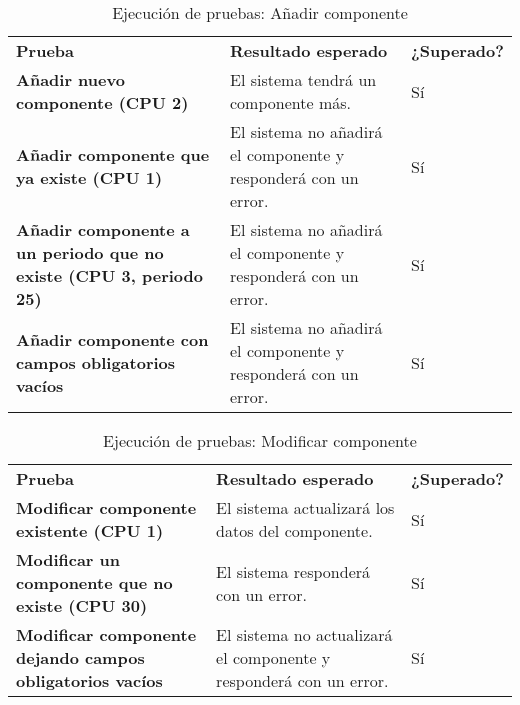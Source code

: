 \begin{table}[H]
\vspace{-4mm}
  \centering
  \caption{Ejecución de pruebas: Añadir componente}
    \begin{tabular}{p{13em}p{18em}p{5em}}
    \toprule
    \rowcolor[rgb]{ .851,  .886,  .953} \multicolumn{3}{p{36em}}{\textbf{Añadir componente}} \\ \midrule
    \rowcolor[rgb]{ .949,  .949,  .949} \textbf{Prueba} & \textbf{Resultado esperado} & \textbf{¿Superado?} \\ \midrule
    \textbf{Añadir nuevo componente (CPU 2)} & El sistema tendrá un componente más.  & Sí  \\ \midrule
    \textbf{Añadir componente que ya existe (CPU 1)} & El sistema no añadirá el componente y responderá con un error.  & Sí  \\ \midrule
    \textbf{Añadir componente a un periodo que no existe (CPU 3, periodo 25)} & El sistema no añadirá el componente y responderá con un error.  & Sí  \\ \midrule
    \textbf{Añadir componente con campos obligatorios vacíos} & El sistema no añadirá el componente y responderá con un error.  & Sí \\ \bottomrule
    \end{tabular}%
\end{table}%
\begin{table}[H]
\vspace{-4mm}
  \centering
  \caption{Ejecución de pruebas: Modificar componente}
    \begin{tabular}{p{13em}p{18em}p{5em}}
    \toprule
    \rowcolor[rgb]{ .851,  .886,  .953} \multicolumn{3}{p{36em}}{\textbf{Modificar componente}} \\ \midrule
    \rowcolor[rgb]{ .949,  .949,  .949} \textbf{Prueba} & \textbf{Resultado esperado} & \textbf{¿Superado?} \\ \midrule
    \textbf{Modificar componente existente (CPU 1)} & El sistema actualizará los datos del componente.  & Sí \\ \midrule
    \textbf{Modificar un componente que no existe (CPU 30)} & El sistema responderá con un error.  & Sí \\ \midrule
    \textbf{Modificar componente dejando campos obligatorios vacíos} &  El sistema no actualizará el componente y responderá con un error.  & Sí \\ \bottomrule
    \end{tabular}%
\end{table}%
